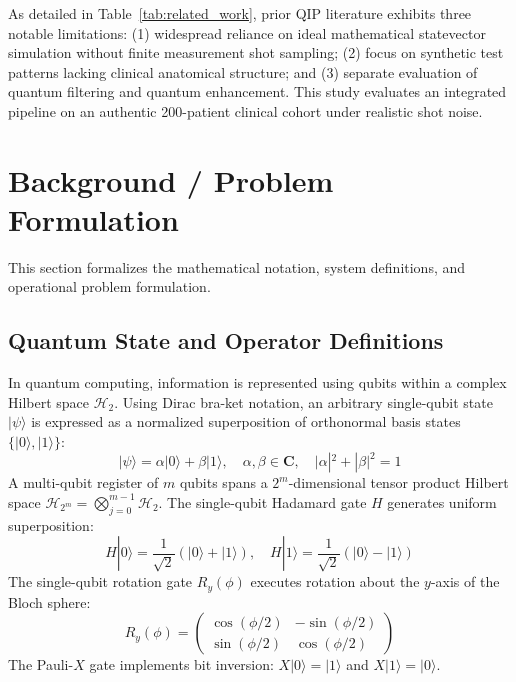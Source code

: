 \documentclass[12pt,onecolumn,draftclsnofoot]{IEEEtran}
\begin{document}
As detailed in Table~\ref{tab:related_work}, prior QIP literature exhibits three notable limitations: (1) widespread reliance on ideal mathematical statevector simulation without finite measurement shot sampling; (2) focus on synthetic test patterns lacking clinical anatomical structure; and (3) separate evaluation of quantum filtering and quantum enhancement. This study evaluates an integrated pipeline on an authentic 200-patient clinical cohort under realistic shot noise.

\section{Background / Problem Formulation}
This section formalizes the mathematical notation, system definitions, and operational problem formulation.

\subsection{Quantum State and Operator Definitions}
In quantum computing, information is represented using qubits within a complex Hilbert space $\mathcal{H}_2$. Using Dirac bra-ket notation, an arbitrary single-qubit state $|\psi\rangle$ is expressed as a normalized superposition of orthonormal basis states $\{|0\rangle, |1\rangle\}$:
\begin{equation}
|\psi\rangle = \alpha |0\rangle + \beta |1\rangle, \quad \alpha, \beta \in \mathbf{C}, \quad |\alpha|^2 + |\beta|^2 = 1
\end{equation}
A multi-qubit register of $m$ qubits spans a $2^m$-dimensional tensor product Hilbert space $\mathcal{H}_{2^m} = \bigotimes_{j=0}^{m-1} \mathcal{H}_2$. The single-qubit Hadamard gate $H$ generates uniform superposition:
\begin{equation}
H |0\rangle = \frac{1}{\sqrt{2}}(|0\rangle + |1\rangle), \quad H |1\rangle = \frac{1}{\sqrt{2}}(|0\rangle - |1\rangle)
\end{equation}
The single-qubit rotation gate $R_y(\phi)$ executes rotation about the $y$-axis of the Bloch sphere:
\begin{equation}
R_y(\phi) = \begin{pmatrix} \cos(\phi/2) & -\sin(\phi/2) \\ \sin(\phi/2) & \cos(\phi/2) \end{pmatrix}
\end{equation}
The Pauli-$X$ gate implements bit inversion: $X|0\rangle = |1\rangle$ and $X|1\rangle = |0\rangle$.
\end{document}
